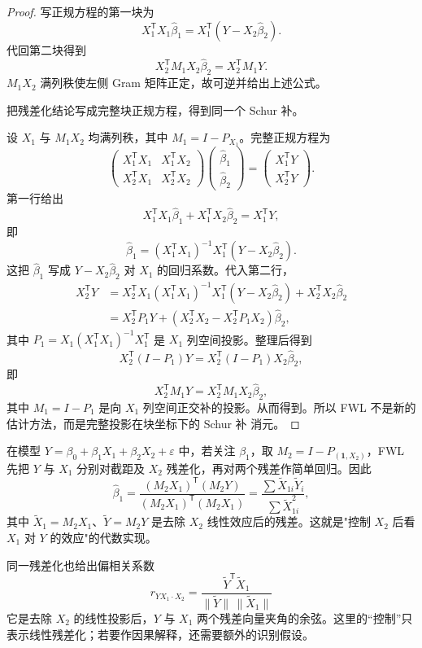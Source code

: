 \begin{proof}
写正规方程的第一块为
\[
 X_1^{\mathsf T}X_1\widehat\beta_1
 =X_1^{\mathsf T}(Y-X_2\widehat\beta_2).
\]
代回第二块得到
\[
 X_2^{\mathsf T}M_1X_2\widehat\beta_2=X_2^{\mathsf T}M_1Y.
\]
$M_1X_2$ 满列秩使左侧 Gram 矩阵正定，故可逆并给出上述公式。

把残差化结论写成完整块正规方程，得到同一个 Schur 补。

设 $X_1$ 与 $M_1X_2$ 均满列秩，其中 $M_1=I-P_{X_1}$。完整正规方程为
\[
 \begin{pmatrix}
 X_1^{\mathsf T}X_1 & X_1^{\mathsf T}X_2\\
 X_2^{\mathsf T}X_1 & X_2^{\mathsf T}X_2
 \end{pmatrix}
 \begin{pmatrix}
 \widehat\beta_1\\
 \widehat\beta_2
 \end{pmatrix}
 =
 \begin{pmatrix}
 X_1^{\mathsf T}Y\\
 X_2^{\mathsf T}Y
 \end{pmatrix}.
\]
第一行给出
\[
 X_1^{\mathsf T}X_1\widehat\beta_1+X_1^{\mathsf T}X_2\widehat\beta_2=X_1^{\mathsf T}Y,
\]
即
\[
 \widehat\beta_1
 =(X_1^{\mathsf T}X_1)^{-1}
 X_1^{\mathsf T}(Y-X_2\widehat\beta_2).
\]
这把 $\widehat\beta_1$ 写成 $Y-X_2\widehat\beta_2$ 对 $X_1$ 的回归系数。代入第二行，
\begin{align*}
 X_2^{\mathsf T}Y
 &=X_2^{\mathsf T}X_1
 (X_1^{\mathsf T}X_1)^{-1}
 X_1^{\mathsf T}(Y-X_2\widehat\beta_2)
 +X_2^{\mathsf T}X_2\widehat\beta_2\\
 &=X_2^{\mathsf T}P_1Y+(X_2^{\mathsf T}X_2-X_2^{\mathsf T}P_1X_2)\widehat\beta_2,
\end{align*}
其中 $P_1=X_1(X_1^{\mathsf T}X_1)^{-1}X_1^{\mathsf T}$ 是 $X_1$ 列空间投影。整理后得到
\[
 X_2^{\mathsf T}(I-P_1)Y
 =X_2^{\mathsf T}(I-P_1)X_2\widehat\beta_2,
\]
即
\[
 X_2^{\mathsf T}M_1Y
 =X_2^{\mathsf T}M_1X_2\widehat\beta_2,
\]
其中 $M_1=I-P_1$ 是向 $X_1$ 列空间正交补的投影。从而得到。所以 FWL 不是新的估计方法，而是完整投影在块坐标下的 Schur 补 消元。
\end{proof}

\begin{workedexample}[控制协变量与偏相关]
在模型 $Y=\beta_0+\beta_1X_1+\beta_2X_2+\varepsilon$ 中，若关注 $\beta_1$，取 $M_2=I-P_{(\mathbf1,X_2)}$，FWL 先把 $Y$ 与 $X_1$ 分别对截距及 $X_2$ 残差化，再对两个残差作简单回归。因此
\[
\widehat\beta_1=\frac{(M_2X_1)^{\mathsf T}(M_2Y)}{(M_2X_1)^{\mathsf T}(M_2X_1)}
=\frac{\sum\tilde X_{1i}\tilde Y_i}{\sum\tilde X_{1i}^2},
\]
其中 $\tilde X_1=M_2X_1$、$\tilde Y=M_2Y$ 是去除 $X_2$ 线性效应后的残差。这就是"控制 $X_2$ 后看 $X_1$ 对 $Y$ 的效应"的代数实现。

同一残差化也给出偏相关系数
\[
r_{YX_1\cdot X_2}=\frac{\tilde Y^{\mathsf T}\tilde X_1}{\|\tilde Y\|\,\|\tilde X_1\|}
\]
它是去除 $X_2$ 的线性投影后，$Y$ 与 $X_1$ 两个残差向量夹角的余弦。这里的“控制”只表示线性残差化；若要作因果解释，还需要额外的识别假设。
\end{workedexample}

